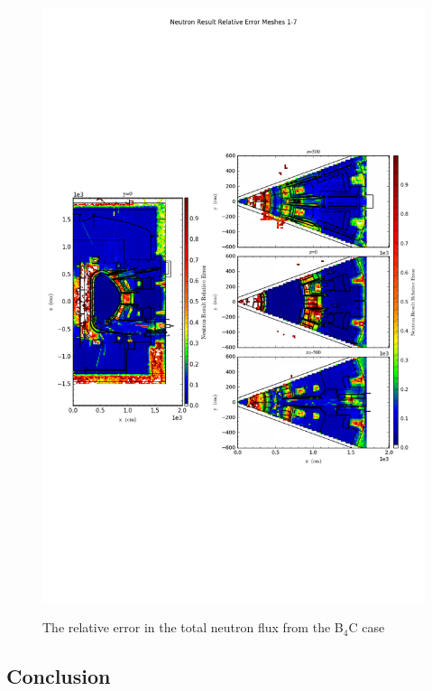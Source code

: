 \documentclass[12pt]{article}
\begin{document}
\begin{figure}[ht!]
  \centering
  \includegraphics[trim={0cm 9cm 0cm 10cm},clip,scale=0.75]{../plots/final_model_with_b4c/Neutron_Result_Relative_Error_Meshes_1-7.png}     
  \label{fig:neutrons_no4bc_relerr}
  \caption{The relative error in the total neutron flux from the B$_4$C case}
\end{figure}


\subsection{Conclusion}
\end{document}
